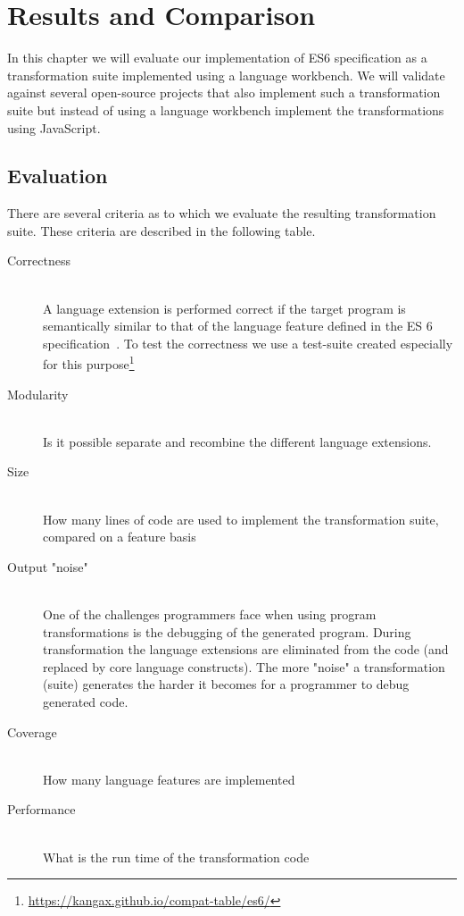 
\chapter{Results and Comparison} %

\label{Chapter6}


In this chapter we will evaluate our implementation of ES6 specification as a transformation suite implemented using a language workbench. We will validate against several open-source projects that also implement such a transformation suite but instead of using a language workbench implement the transformations using JavaScript.

\section{Evaluation}

There are several criteria as to which we evaluate the resulting transformation suite. These criteria are described in the following table.

\begin{description}
\item[Correctness] \hfill \\ A language extension is performed correct if the target program is semantically similar to that of the language feature defined in the ES 6 specification~\cite{SpecJS}. To test the correctness we use a test-suite created especially for this purpose\footnote{\url{https://kangax.github.io/compat-table/es6/}}
\item[Modularity] \hfill \\ Is it possible separate and recombine the different language extensions.
\item[Size] \hfill \\ How many lines of code are used to implement the transformation suite, compared on a feature basis
\item[Output "noise"] \hfill \\ One of the challenges programmers face when using program transformations is the debugging of the generated program. During transformation the language extensions are eliminated from the code (and replaced by core language constructs). The more "noise" a transformation (suite) generates the harder it becomes for a programmer to debug generated code.
\item[Coverage] \hfill \\ How many language features are implemented
\item[Performance] \hfill \\ What is the run time of the transformation code
\end{description}


